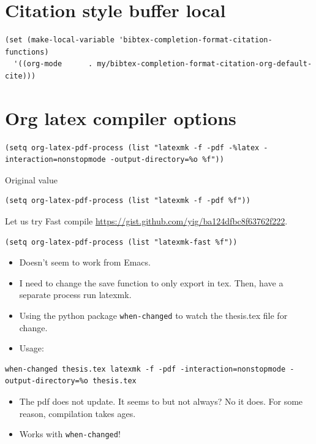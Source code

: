 \documentclass[letterpaper, 12pt]{report}
\begin{document}
\section{Citation style buffer local}
\label{sec:org61822fa}

\begin{verbatim}
(set (make-local-variable 'bibtex-completion-format-citation-functions)
  '((org-mode      . my/bibtex-completion-format-citation-org-default-cite)))
\end{verbatim}
\section{Org latex compiler options}
\label{sec:orgbba41e5}

\begin{verbatim}
(setq org-latex-pdf-process (list "latexmk -f -pdf -%latex -interaction=nonstopmode -output-directory=%o %f"))
\end{verbatim}

Original value

\begin{verbatim}
(setq org-latex-pdf-process (list "latexmk -f -pdf %f"))
\end{verbatim}

Let us try Fast compile \url{https://gist.github.com/yig/ba124dfbc8f63762f222}.

\begin{verbatim}
(setq org-latex-pdf-process (list "latexmk-fast %f"))
\end{verbatim}

\begin{itemize}
\item Doesn't seem to work from Emacs.
\item I need to change the save function to only export in tex. Then, have a separate process run latexmk.
\item Using the python package \texttt{when-changed} to watch the thesis.tex file for change.
\item Usage:
\end{itemize}

\begin{verbatim}
when-changed thesis.tex latexmk -f -pdf -interaction=nonstopmode -output-directory=%o thesis.tex
\end{verbatim}

\begin{itemize}
\item The pdf does not update. It seems to but not always? No it does. For some reason, compilation takes ages.
\item Works with \texttt{when-changed}!
\end{itemize}
\end{document}
